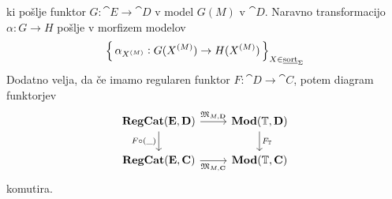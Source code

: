 \documentclass[../kategoricna_logika.tex]{subfiles}
\begin{document}
ki pošlje funktor $G : \cat{E} \to \cat{D}$ v model $G(M)$ v
$\cat{D}$.  Naravno transformacijo $\alpha : G \to H$ pošlje v
morfizem modelov
$$\left\lbrace\,\alpha_{{X}^{(M)}}: G({X}^{(M)}) \to H({X}^{(M)})\,\right\rbrace_{X \in \underline{\mathrm{sort}}_{\Sigma}}$$
Dodatno velja, da če imamo regularen funktor
$F : \cat{D} \to \cat{C}$, potem diagram funktorjev
\begin{equation}\label{diag:naravnost-M}
  \begin{tikzcd}
    \cat{RegCat}(\cat{E}, \cat{D}) \ar[d, "F \circ (\_)"'] \ar[r, "\mathfrak{M}_{M,\cat{D}}"] & \Mod(\T, \cat{D}) \ar[d, "F_{\T}"] \\
    \cat{RegCat}(\cat{E}, \cat{C}) \ar[r, "\mathfrak{M}_{M,\cat{C}}"']
    & \Mod(\T, \cat{C})
  \end{tikzcd}
\end{equation}
komutira.
\end{document}
